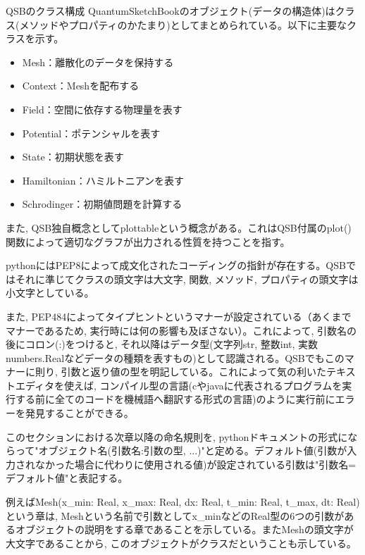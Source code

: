 \documentclass[a4paper, lualatex]{bxjsarticle}
\begin{document}
\begin{section}{QSBのクラス構成\label{AppQ}}
    QuantumSketchBookのオブジェクト(データの構造体)はクラス(メソッドやプロパティのかたまり)としてまとめられている。以下に主要なクラスを示す。
    \begin{itemize}
        \item Mesh：離散化のデータを保持する
        \item Context：Meshを配布する
        \item Field：空間に依存する物理量を表す
        \item Potential：ポテンシャルを表す
        \item State：初期状態を表す
        \item Hamiltonian：ハミルトニアンを表す
        \item Schrodinger：初期値問題を計算する
    \end{itemize}
    \par また, QSB独自概念としてplottableという概念がある。これはQSB付属のplot()関数によって適切なグラフが出力される性質を持つことを指す。
    \par pythonにはPEP8\cite{pep8}によって成文化されたコーディングの指針が存在する。QSBではそれに準じてクラスの頭文字は大文字, 関数, メソッド, プロパティの頭文字は小文字としている。
    \par また, PEP484\cite{pep484}によってタイプヒントというマナーが設定されている（あくまでマナーであるため, 実行時には何の影響も及ぼさない）。これによって, 引数名の後にコロン(:)をつけると, それ以降はデータ型(文字列str, 整数int, 実数numbers.Realなどデータの種類を表すもの)として認識される。QSBでもこのマナーに則り, 引数と返り値の型を明記している。これによって気の利いたテキストエディタを使えば, コンパイル型の言語(cやjavaに代表されるプログラムを実行する前に全てのコードを機械語へ翻訳する形式の言語)のように実行前にエラーを発見することができる。
    \par このセクションにおける次章以降の命名規則を, pythonドキュメントの形式にならって"オブジェクト名(引数名:引数の型, ...)"と定める。デフォルト値(引数が入力されなかった場合に代わりに使用される値)が設定されている引数は"引数名=デフォルト値"と表記する。
    \par 例えばMesh(x\_min: Real, x\_max: Real, dx: Real, t\_min: Real, t\_max, dt: Real)という章は, Meshという名前で引数としてx\_minなどのReal型の6つの引数があるオブジェクトの説明をする章であることを示している。またMeshの頭文字が大文字であることから, このオブジェクトがクラスだということも示している。


\end{section}
\end{document}
